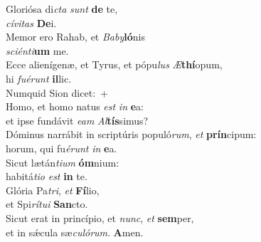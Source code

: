 \evenverse Gloriósa di\textit{cta} \textit{sunt} \textbf{de} te,~\*\\
\evenverse \textit{cí}\textit{vi}\textit{tas} \textbf{De}i.\\
\oddverse Memor ero Rahab, et \textit{Ba}\textit{by}\textbf{ló}nis~\*\\
\oddverse \textit{sci}\textit{én}\textit{ti}\textbf{um} me.\\
\evenverse Ecce alienígenæ, et Tyrus, et pópu\textit{lus} \textit{Æ}\textbf{thí}opum,~\*\\
\evenverse hi \textit{fu}\textit{é}\textit{runt} \textbf{il}lic.\\
\oddverse Numquid Sion dicet:~+\\
\oddverse  Homo, et homo natus \textit{est} \textit{in} \textbf{e}a:~\*\\
\oddverse et ipse fundávit \textit{e}\textit{am} \textit{Al}\textbf{tís}simus?\\
\evenverse Dóminus narrábit in scriptúris populó\textit{rum}, \textit{et} \textbf{prín}cipum:~\*\\
\evenverse horum, qui fu\textit{é}\textit{runt} \textit{in} \textbf{e}a.\\
\oddverse Sicut lætán\textit{ti}\textit{um} \textbf{óm}nium:~\*\\
\oddverse habitá\textit{ti}\textit{o} \textit{est} \textbf{in} te.\\
\evenverse Glória Pa\textit{tri}, \textit{et} \textbf{Fí}lio,~\*\\
\evenverse et Spi\textit{rí}\textit{tu}\textit{i} \textbf{San}cto.\\
\oddverse Sicut erat in princípio, et \textit{nunc}, \textit{et} \textbf{sem}per,~\*\\
\oddverse et in sǽcula sæ\textit{cu}\textit{ló}\textit{rum}. \textbf{A}men.\\
